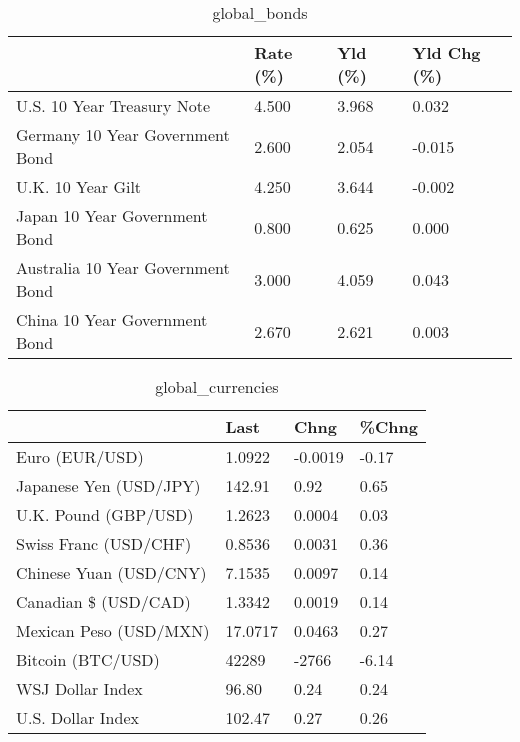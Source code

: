 \documentclass{article}%
\begin{document}
%


\begin{table}[htbp]%
\caption{global\_bonds}%
\centering%
\begin{adjustbox}{width=1\textwidth}%
\begin{tabular}{llll}
\toprule
                                  & Rate (\%) & Yld (\%) & Yld Chg (\%) \\
\midrule
       U.S. 10 Year Treasury Note &    4.500 &   3.968 &       0.032 \\
  Germany 10 Year Government Bond &    2.600 &   2.054 &      -0.015 \\
                U.K. 10 Year Gilt &    4.250 &   3.644 &      -0.002 \\
    Japan 10 Year Government Bond &    0.800 &   0.625 &       0.000 \\
Australia 10 Year Government Bond &    3.000 &   4.059 &       0.043 \\
    China 10 Year Government Bond &    2.670 &   2.621 &       0.003 \\
\bottomrule
\end{tabular}
%
\end{adjustbox}%
\end{table}

%


\begin{table}[htbp]%
\caption{global\_currencies}%
\centering%
\begin{adjustbox}{width=1\textwidth}%
\begin{tabular}{llll}
\toprule
                       &    Last &    Chng & \%Chng \\
\midrule
        Euro (EUR/USD) &  1.0922 & -0.0019 & -0.17 \\
Japanese Yen (USD/JPY) &  142.91 &    0.92 &  0.65 \\
  U.K. Pound (GBP/USD) &  1.2623 &  0.0004 &  0.03 \\
 Swiss Franc (USD/CHF) &  0.8536 &  0.0031 &  0.36 \\
Chinese Yuan (USD/CNY) &  7.1535 &  0.0097 &  0.14 \\
  Canadian \$ (USD/CAD) &  1.3342 &  0.0019 &  0.14 \\
Mexican Peso (USD/MXN) & 17.0717 &  0.0463 &  0.27 \\
     Bitcoin (BTC/USD) &   42289 &   -2766 & -6.14 \\
      WSJ Dollar Index &   96.80 &    0.24 &  0.24 \\
     U.S. Dollar Index &  102.47 &    0.27 &  0.26 \\
\bottomrule
\end{tabular}
%
\end{adjustbox}%
\end{table}
\end{document}
